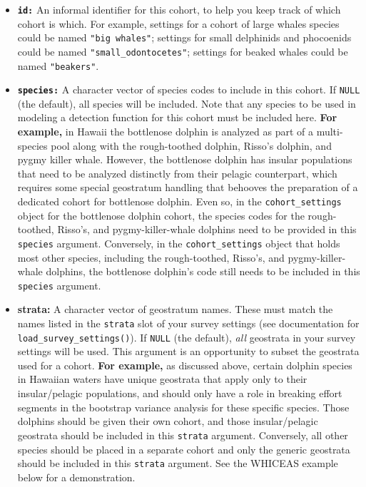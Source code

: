 \documentclass[
]{book}
\begin{document}
\begin{itemize}
\item
  \textbf{\texttt{id:}} An informal identifier for this cohort, to help you keep track of which cohort is which. For example, settings for a cohort of large whales species could be named \texttt{"big\ whales"}; settings for small delphinids and phocoenids could be named \texttt{"small\_odontocetes"}; settings for beaked whales could be named \texttt{"beakers"}.
\item
  \textbf{\texttt{species:}} A character vector of species codes to include in this cohort. If \texttt{NULL} (the default), all species will be included. Note that any species to be used in modeling a detection function for this cohort must be included here. \textbf{For example,} in Hawaii the bottlenose dolphin is analyzed as part of a multi-species pool along with the rough-toothed dolphin, Risso's dolphin, and pygmy killer whale. However, the bottlenose dolphin has insular populations that need to be analyzed distinctly from their pelagic counterpart, which requires some special geostratum handling that behooves the preparation of a dedicated cohort for bottlenose dolphin. Even so, in the \texttt{cohort\_settings} object for the bottlenose dolphin cohort, the species codes for the rough-toothed, Risso's, and pygmy-killer-whale dolphins need to be provided in this \texttt{species} argument. Conversely, in the \texttt{cohort\_settings} object that holds most other species, including the rough-toothed, Risso's, and pygmy-killer-whale dolphins, the bottlenose dolphin's code still needs to be included in this \texttt{species} argument.
\item
  \textbf{strata:} A character vector of geostratum names. These must match the names
  listed in the \texttt{strata} slot of your survey settings (see documentation for \texttt{load\_survey\_settings()}). If \texttt{NULL} (the default), \emph{all} geostrata in your survey settings will be used. This argument is an opportunity to subset the geostrata used for a cohort. \textbf{For example,} as discussed above, certain dolphin species in Hawaiian waters have unique geostrata that apply only to their insular/pelagic populations, and should only have a role in breaking effort segments in the bootstrap variance analysis for these specific species. Those dolphins should be given their own cohort, and those insular/pelagic geostrata should be included in this \texttt{strata} argument. Conversely, all other species should be placed in a separate cohort and only the generic geostrata should be included in this \texttt{strata} argument. See the WHICEAS example below for a demonstration.

\end{itemize}
\end{document}
